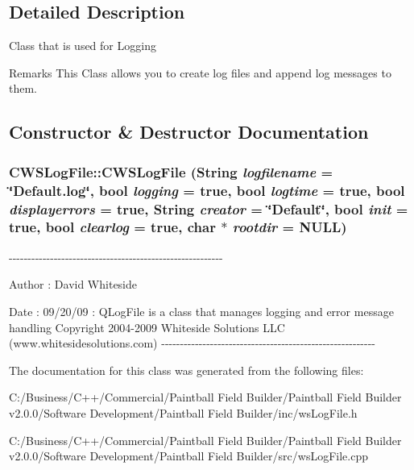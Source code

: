 \subsection{Detailed Description}
Class that is used for Logging \begin{DoxyRemark}{Remarks}
This Class allows you to create log files and append log messages to them. 
\end{DoxyRemark}


\subsection{Constructor \& Destructor Documentation}
\hypertarget{class_c_w_s_log_file_a2afe19c9c17e8c4b1b471b38c706c5c5}{
\subsubsection[{CWSLogFile}]{\setlength{\rightskip}{0pt plus 5cm}CWSLogFile::CWSLogFile (String {\em logfilename} = {\ttfamily \char`\"{}Default.log\char`\"{}}, \/  bool {\em logging} = {\ttfamily true}, \/  bool {\em logtime} = {\ttfamily true}, \/  bool {\em displayerrors} = {\ttfamily true}, \/  String {\em creator} = {\ttfamily \char`\"{}Default\char`\"{}}, \/  bool {\em init} = {\ttfamily true}, \/  bool {\em clearlog} = {\ttfamily true}, \/  char $\ast$ {\em rootdir} = {\ttfamily NULL})}}
\label{class_c_w_s_log_file_a2afe19c9c17e8c4b1b471b38c706c5c5}
-\/-\/-\/-\/-\/-\/-\/-\/-\/-\/-\/-\/-\/-\/-\/-\/-\/-\/-\/-\/-\/-\/-\/-\/-\/-\/-\/-\/-\/-\/-\/-\/-\/-\/-\/-\/-\/-\/-\/-\/-\/-\/-\/-\/-\/-\/-\/-\/-\/-\/-\/-\/-\/-\/-\/-\/-\/ \begin{DoxyAuthor}{Author}
: David Whiteside 
\end{DoxyAuthor}
\begin{DoxyDate}{Date}
: 09/20/09 : QLogFile is a class that manages logging and error message handling Copyright 2004-\/2009 Whiteside Solutions LLC (www.whitesidesolutions.com) -\/-\/-\/-\/-\/-\/-\/-\/-\/-\/-\/-\/-\/-\/-\/-\/-\/-\/-\/-\/-\/-\/-\/-\/-\/-\/-\/-\/-\/-\/-\/-\/-\/-\/-\/-\/-\/-\/-\/-\/-\/-\/-\/-\/-\/-\/-\/-\/-\/-\/-\/-\/-\/-\/-\/-\/-\/ 
\end{DoxyDate}


The documentation for this class was generated from the following files:\begin{DoxyCompactItemize}
\item 
C:/Business/C++/Commercial/Paintball Field Builder/Paintball Field Builder v2.0.0/Software Development/Paintball Field Builder/inc/wsLogFile.h\item 
C:/Business/C++/Commercial/Paintball Field Builder/Paintball Field Builder v2.0.0/Software Development/Paintball Field Builder/src/wsLogFile.cpp\end{DoxyCompactItemize}
